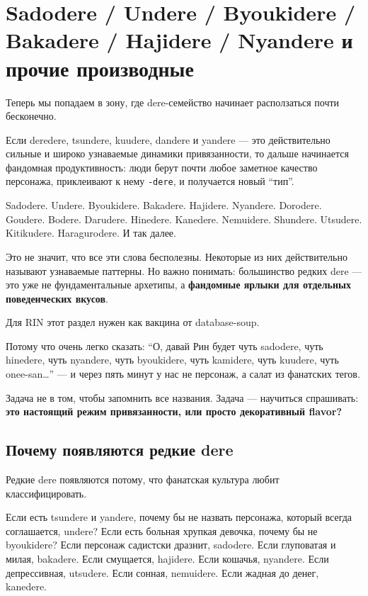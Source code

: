 \section{Sadodere / Undere / Byoukidere / Bakadere / Hajidere / Nyandere и прочие производные}

Теперь мы попадаем в зону, где dere-семейство начинает расползаться
почти бесконечно.

Если deredere, tsundere, kuudere, dandere и yandere --- это
действительно сильные и широко узнаваемые динамики привязанности, то
дальше начинается фандомная продуктивность: люди берут почти любое
заметное качество персонажа, приклеивают к нему \texttt{-dere}, и
получается новый ``тип''.

Sadodere. Undere. Byoukidere. Bakadere. Hajidere. Nyandere. Dorodere.
Goudere. Bodere. Darudere. Hinedere. Kanedere. Nemuidere. Shundere.
Utsudere. Kitikudere. Haragurodere. И так далее.

Это не значит, что все эти слова бесполезны. Некоторые из них
действительно называют узнаваемые паттерны. Но важно понимать:
большинство редких dere --- это уже не фундаментальные архетипы, а
\textbf{фандомные ярлыки для отдельных поведенческих вкусов}.

Для RIN этот раздел нужен как вакцина от database-soup.

Потому что очень легко сказать: ``О, давай Рин будет чуть sadodere, чуть
hinedere, чуть nyandere, чуть byoukidere, чуть kamidere, чуть kuudere,
чуть onee-san\ldots{}'' --- и через пять минут у нас не персонаж, а
салат из фанатских тегов.

Задача не в том, чтобы запомнить все названия. Задача --- научиться
спрашивать: \textbf{это настоящий режим привязанности, или просто
декоративный flavor?}

\subsection*{Почему появляются редкие dere}

Редкие dere появляются потому, что фанатская культура любит
классифицировать.

Если есть tsundere и yandere, почему бы не назвать персонажа, который
всегда соглашается, undere? Если есть больная хрупкая девочка, почему бы
не byoukidere? Если персонаж садистски дразнит, sadodere. Если
глуповатая и милая, bakadere. Если смущается, hajidere. Если кошачья,
nyandere. Если депрессивная, utsudere. Если сонная, nemuidere. Если
жадная до денег, kanedere.

